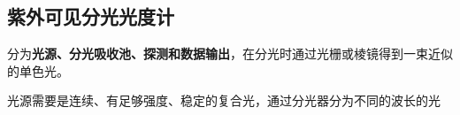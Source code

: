\subsection{紫外可见分光光度计}%
\label{sub:紫外可见分光光度计}
分为\textbf{光源、分光吸收池、探测和数据输出}，在分光时通过光栅或棱镜得到一束近似的单色光。
\begin{notation}
    光源需要是连续、有足够强度、稳定的复合光，通过分光器分为不同的波长的光
\end{notation}
